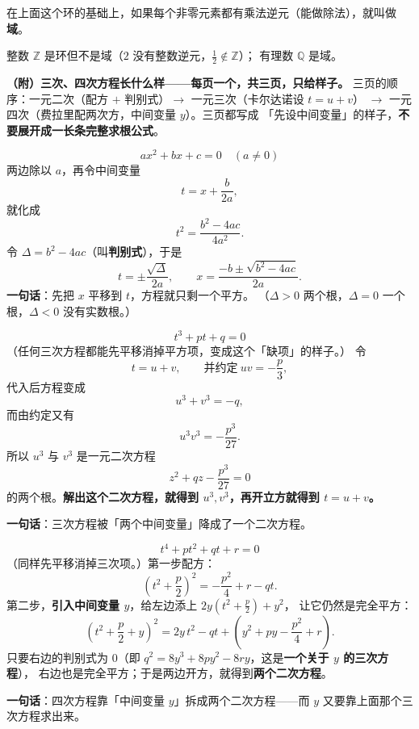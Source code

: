 \begin{definition}[域]
  在上面这个环的基础上，如果每个非零元素都有乘法逆元（能做除法），就叫做\textbf{域}。
\end{definition}

\begin{example}
  整数 \(\mathbb{Z}\) 是环但不是域（\(2\) 没有整数逆元，\(\tfrac12\notin\mathbb{Z}\)）；
  有理数 \(\mathbb{Q}\) 是域。
\end{example}

\begin{caozuo}
  \textbf{（附）三次、四次方程长什么样——每页一个，共三页，只给样子。}
  三页的顺序：一元二次（配方 \(+\) 判别式）\(\to\) 一元三次（卡尔达诺设 \(t=u+v\)）
  \(\to\) 一元四次（费拉里配两次方，中间变量 \(y\)）。三页都写成
  「先设中间变量」的样子，\textbf{不要展开成一长条完整求根公式}。
\end{caozuo}

\begin{example}
  \[ ax^2+bx+c=0\quad(a\neq0) \]
  两边除以 \(a\)，再令中间变量
  \[ t=x+\frac{b}{2a}, \]
  就化成
  \[ t^2=\frac{b^2-4ac}{4a^2}. \]
  令 \(\Delta=b^2-4ac\)（叫\textbf{判别式}），于是
  \[ t=\pm\frac{\sqrt{\Delta}}{2a},\qquad x=\frac{-b\pm\sqrt{b^2-4ac}}{2a}. \]
  \textbf{一句话}：先把 \(x\) 平移到 \(t\)，方程就只剩一个平方。
  （\(\Delta>0\) 两个根，\(\Delta=0\) 一个根，\(\Delta<0\) 没有实数根。）
\end{example}

\begin{example}[一元三次方程：卡尔达诺设 \(t=u+v\)]
  \[ t^3+pt+q=0 \]
  （任何三次方程都能先平移消掉平方项，变成这个「缺项」的样子。）
  令
  \[ t=u+v,\qquad\text{并约定}\ uv=-\frac{p}{3}, \]
  代入后方程变成
  \[ u^3+v^3=-q, \]
  而由约定又有
  \[ u^3v^3=-\frac{p^3}{27}. \]
  所以 \(u^3\) 与 \(v^3\) 是一元二次方程
  \[ z^2+qz-\frac{p^3}{27}=0 \]
  的两个根。\textbf{解出这个二次方程，就得到 \(u^3,v^3\)，再开立方就得到 \(t=u+v\)。}

  \textbf{一句话}：三次方程被「两个中间变量」降成了一个二次方程。
\end{example}

\begin{example}
  \[ t^4+pt^2+qt+r=0 \]
  （同样先平移消掉三次项。）第一步配方：
  \[ \left(t^2+\frac{p}{2}\right)^2=-\frac{p^2}{4}+r-qt. \]
  第二步，\textbf{引入中间变量 \(y\)}，给左边添上 \(2y\left(t^2+\frac p2\right)+y^2\)，
  让它仍然是完全平方：
  \[ \left(t^2+\frac{p}{2}+y\right)^2
     =2y\,t^2-qt+\left(y^2+py-\frac{p^2}{4}+r\right). \]
  只要右边的判别式为 \(0\)（即 \(q^2=8y^3+8py^2-8ry\)，这是\textbf{一个关于 \(y\) 的三次方程}），
  右边也是完全平方；于是两边开方，就得到\textbf{两个二次方程}。

  \textbf{一句话}：四次方程靠「中间变量 \(y\)」拆成两个二次方程——而 \(y\) 又要靠上面那个三次方程求出来。
\end{example}

